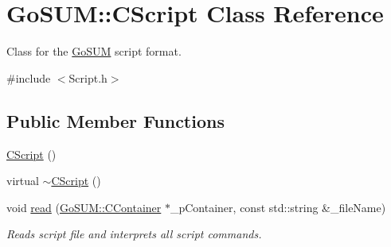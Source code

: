 \hypertarget{class_go_s_u_m_1_1_c_script}{\section{Go\-S\-U\-M\-:\-:C\-Script Class Reference}
\label{class_go_s_u_m_1_1_c_script}
}


Class for the \hyperlink{struct_go_s_u_m}{Go\-S\-U\-M} script format.  




{\ttfamily \#include $<$Script.\-h$>$}

\subsection*{Public Member Functions}
\begin{DoxyCompactItemize}
\item 
\hyperlink{class_go_s_u_m_1_1_c_script_a06c3e2db22ecff77965d66bc02d341d2}{C\-Script} ()
\item 
virtual \hyperlink{class_go_s_u_m_1_1_c_script_a3c53e854d5bb35c32847beb29acb1060}{$\sim$\-C\-Script} ()
\item 
void \hyperlink{class_go_s_u_m_1_1_c_script_a342b561a6400679b076b17e5deb348f1}{read} (\hyperlink{class_go_s_u_m_1_1_c_container}{Go\-S\-U\-M\-::\-C\-Container} $\ast$\-\_\-p\-Container, const std\-::string \&\-\_\-file\-Name)
\begin{DoxyCompactList}\small\item\em Reads script file and interprets all script commands. \end{DoxyCompactList}\end{DoxyCompactItemize}
